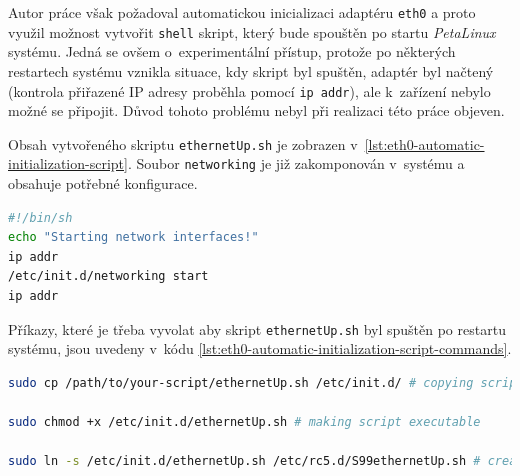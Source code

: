 \documentclass[a4paper, twoside, 11pt]{article}
\newcommand{\fbar}{\FloatBarrier}
\begin{document}
	Autor práce však požadoval automatickou inicializaci adaptéru \texttt{eth0} a proto využil možnost vytvořit \texttt{shell} skript, který bude spouštěn po startu \textit{PetaLinux} systému. Jedná se ovšem o~experimentální přístup, protože po některých restartech systému vznikla situace, kdy skript byl spuštěn, adaptér byl načtený (kontrola přiřazené IP adresy proběhla pomocí \texttt{ip addr}), ale k~zařízení nebylo možné se připojit. Důvod tohoto problému nebyl při realizaci této práce objeven.\par
	Obsah vytvořeného skriptu \texttt{ethernetUp.sh} je zobrazen v~\ref{lst:eth0-automatic-initialization-script}. Soubor \texttt{networking} je již zakomponován v~systému a obsahuje potřebné konfigurace.\par

	\begin{lstlisting}[language={sh}, caption={Skript pro automatickou inicializaci adaptéru eth0}, label={lst:eth0-automatic-initialization-script}, morekeywords={}]
#!/bin/sh		
echo "Starting network interfaces!"
ip addr
/etc/init.d/networking start
ip addr\end{lstlisting}

	Příkazy, které je třeba vyvolat aby skript \texttt{ethernetUp.sh} byl spuštěn po restartu systému, jsou uvedeny v~kódu \ref{lst:eth0-automatic-initialization-script-commands}.

\begin{lstlisting}[language={sh}, caption={Skript pro automatickou inicializaci adaptéru eth0}, label={lst:eth0-automatic-initialization-script-commands}, morekeywords={}]
sudo cp /path/to/your-script/ethernetUp.sh /etc/init.d/ # copying script to init.d directory

sudo chmod +x /etc/init.d/ethernetUp.sh # making script executable

sudo ln -s /etc/init.d/ethernetUp.sh /etc/rc5.d/S99ethernetUp.sh # creating soft symbolic link to a script in the folder rc5.d which represents layer, when the script should be run\end{lstlisting}


	\fbar
\end{document}
